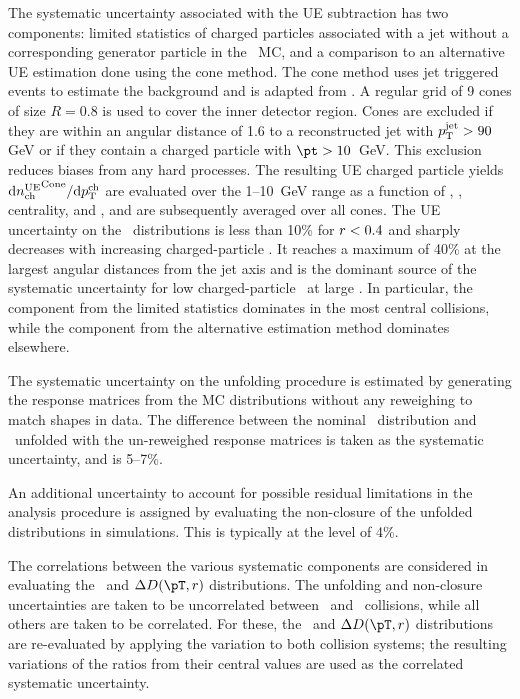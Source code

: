 The systematic uncertainty associated with the UE subtraction has two components: limited statistics of charged particles associated with a jet without a corresponding generator particle in the \pbpb\ MC, and a comparison to an alternative UE estimation done using the cone method. The cone method uses jet triggered events to estimate the background and is adapted from \cite{Aaboud:2018hpb, Aaboud:2017bzv}. A regular grid of 9 cones of size $R = 0.8$ is used to cover the inner detector region. Cones are excluded if they are within an angular distance of 1.6 to a reconstructed jet with $\mbox{$p_{\mathrm{T}}^{\mathrm{jet}}$} > 90$ GeV or if they contain a charged particle with \mbox{$\pt > 10$ GeV}. This exclusion reduces biases from any hard processes. The resulting UE charged particle yields $\mathrm{d} \mbox{$n_{\mathrm{ch}}^{\mathrm{UE}}$}^{\mathrm{Cone}}/ \mathrm{d} \mbox{$p_{{\mathrm{T}}}^{\mathrm{ch}}$}$ are evaluated over the \mbox{1--10 GeV} range as a function of \pttrk, \ptjet, centrality, and \rvar, and are subsequently averaged over all cones. The UE uncertainty on the \Dptr\ distributions is less than 10\% for $\mbox{$r$} < 0.4$ and sharply decreases with increasing charged-particle \pT. It  reaches a maximum of 40\% at the largest angular distances from the jet axis and is the dominant source of the systematic uncertainty for low charged-particle \pt\ at large \rvar. In particular, the component from the limited statistics dominates in the most central collisions, while the component from the alternative estimation method dominates elsewhere.


The systematic uncertainty on the unfolding procedure is estimated by generating the response matrices from the MC distributions without any reweighing to match shapes in data. The difference between the nominal \Dptr\ distribution and \Dptr\ unfolded with the un-reweighed response matrices is taken as the systematic uncertainty, and is 5--7\%.

An additional uncertainty to account for possible residual limitations in the analysis procedure is assigned by evaluating the non-closure of the unfolded distributions in simulations. This is typically at the level of 4\%.

The correlations between the various systematic components are considered in evaluating the \RDptr\ and $\Delta\Dptr$ distributions. The unfolding and non-closure uncertainties are taken to be uncorrelated between \pp\ and \pbpb\ collisions, while all others are taken to be correlated. For these, the \RDptr\ and $\Delta\Dptr$ distributions are re-evaluated by applying the variation to both collision systems; the resulting variations of the ratios from their central values are used as the correlated systematic uncertainty. 

